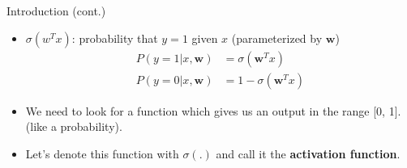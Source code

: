 \documentclass[serif, aspectratio=169]{beamer}
\begin{document}
    \begin{frame}{Introduction (cont.)}
        \begin{itemize}
            \item $\sigma (w^Tx)$: probability that $y=1$ given $x$ (parameterized by \textbf{$\textbf{w}$})
            \begin{align*}
                P(y=1|x,\mathbf{w}) &= \sigma (\mathbf{w}^Tx) \\
                P(y=0|x,\mathbf{w}) &= 1 - \sigma (\mathbf{w}^Tx)
            \end{align*}

            \item We need to look for a function which gives us an output in the range [0, 1]. (like a probability).

            \item Let's denote this function with $\sigma (.)$ and call it the \textbf{activation function}.

        \end{itemize}
    \end{frame}
\end{document}
